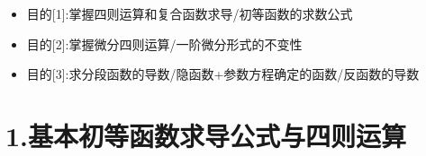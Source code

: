 \documentclass[11pt,a4paper,UTF8]{ctexart}
\begin{document}
\pagestyle{fancy}
\fancyhf{}
\fancyhead[R]{\small\color{TitlePurple}\nouppercase{\leftmark}}
\renewcommand{\headrulewidth}{0.5pt}

\tableofcontents
\newpage
{}


\begin{targetbox}[本章复习目标与核心知识图谱]
\begin{itemize}
  \item 目的[1]:掌握四则运算和复合函数求导/初等函数的求数公式
\end{itemize}
\end{targetbox}

\begin{targetbox}[本章复习目标与核心知识图谱]
\begin{itemize}
  \item 目的[2]:掌握微分四则运算/一阶微分形式的不变性
\end{itemize}
\end{targetbox}

\begin{targetbox}[本章复习目标与核心知识图谱]
\begin{itemize}
  \item 目的[3]:求分段函数的导数/隐函数+参数方程确定的函数/反函数的导数
\end{itemize}
\end{targetbox}


\section{1.基本初等函数求导公式与四则运算}
\end{document}
